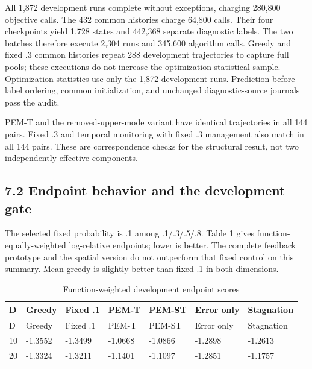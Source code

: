 \documentclass[11pt,a4paper]{article}
\begin{document}
All 1,872 development runs complete without exceptions, charging 280,800
objective calls. The 432 common histories charge 64,800 calls. Their
four checkpoints yield 1,728 states and 442,368 separate diagnostic
labels. The two batches therefore execute 2,304 runs and 345,600
algorithm calls. Greedy and fixed .3 common histories repeat 288
development trajectories to capture full pools; these executions do not
increase the optimization statistical sample. Optimization statistics
use only the 1,872 development runs. Prediction-before-label ordering,
common initialization, and unchanged diagnostic-source journals pass the
audit.

PEM-T and the removed-upper-mode variant have identical trajectories in
all 144 pairs. Fixed .3 and temporal monitoring with fixed .3 management
also match in all 144 pairs. These are correspondence checks for the
structural result, not two independently effective components.

\hypertarget{endpoint-behavior-and-the-development-gate}{%
\subsection{7.2 Endpoint behavior and the development
gate}\label{endpoint-behavior-and-the-development-gate}}

The selected fixed probability is .1 among .1/.3/.5/.8. Table 1 gives
function-equally-weighted log-relative endpoints; lower is better. The
complete feedback prototype and the spatial version do not outperform
that fixed control on this summary. Mean greedy is slightly better than
fixed .1 in both dimensions.

\par\noindent\begin{minipage}{\linewidth}

\begin{longtable}[]{@{}lllllll@{}}
\caption{Function-weighted development endpoint scores}\tabularnewline
\toprule
D & Greedy & Fixed .1 & PEM-T & PEM-ST & Error only & Stagnation \\
\midrule
\endfirsthead
\toprule
D & Greedy & Fixed .1 & PEM-T & PEM-ST & Error only & Stagnation \\
\midrule
\endhead
10 & -1.3552 & -1.3499 & -1.0668 & -1.0866 & -1.2898 & -1.2613 \\
20 & -1.3324 & -1.3211 & -1.1401 & -1.1097 & -1.2851 & -1.1757 \\
\bottomrule
\end{longtable}

\end{minipage}\par
\end{document}
